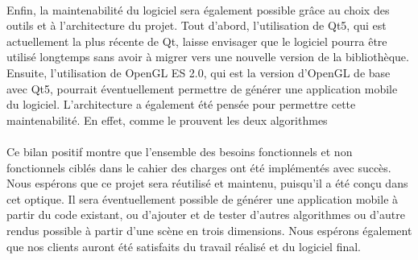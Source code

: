 \paragraph{}
Enfin, la maintenabilité du logiciel sera également possible grâce au choix des outils et à l'architecture du projet. 
Tout d'abord, l'utilisation de Qt5, qui est actuellement la plus récente de Qt, laisse envisager que le logiciel pourra être utilisé longtemps sans avoir à migrer vers une nouvelle version de la bibliothèque. Ensuite, l'utilisation de OpenGL ES 2.0, qui est la version d'OpenGL de base avec Qt5, pourrait éventuellement permettre de générer une application mobile du logiciel. 
L'architecture a également été pensée pour permettre cette maintenabilité. En effet, comme le prouvent les deux algorithmes 


\paragraph{}
Ce bilan positif montre que l'ensemble des besoins fonctionnels et non fonctionnels ciblés dans le cahier des charges ont été implémentés avec succès. Nous espérons que ce projet sera réutilisé et maintenu, puisqu'il a été conçu dans cet optique. Il sera éventuellement possible de générer une application mobile à partir du code existant, ou d'ajouter et de tester d'autres algorithmes ou d'autre rendus possible à partir d'une scène en trois dimensions. Nous espérons également que nos clients auront été satisfaits du travail réalisé et du logiciel final. 
